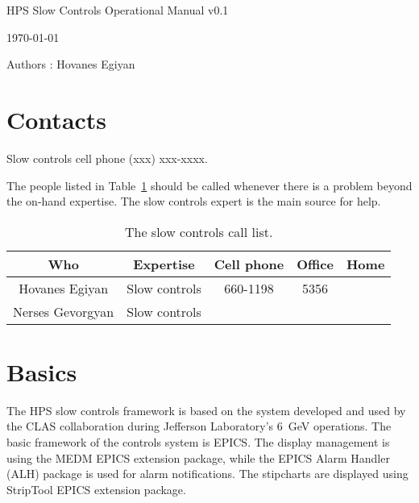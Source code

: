\documentclass[letter,10pt]{article}
\begin{document}
\begin{center}
\Large HPS Slow Controls Operational Manual v0.1

\today

\normalsize Authors : Hovanes Egiyan\\

\end{center}

\section{Contacts}
Slow controls cell phone (xxx) xxx-xxxx. \newline 

The people listed in Table~\ref{tab:controls_contact} should be called whenever there is a problem beyond the on-hand
expertise. The slow controls expert is the main source for help.
\begin{table}[h]
\begin{center}
\begin{tabular}{|c|c|c|c|c|}   \hline
	  Who 			& Expertise		&  Cell phone	&   Office  	&		Home    \\  \hline
\hline
         Hovanes Egiyan		& Slow controls		& 660-1198	&  5356		& 			\\  \hline
         Nerses Gevorgyan	& Slow controls		&		& 		& 			\\  \hline 
\end{tabular}
\end{center}
\caption{The slow controls call list.}
\label{tab:controls_contact}
\end{table}


\section{Basics}
The HPS slow controls framework is based on the system developed and used by the CLAS collaboration during Jefferson Laboratory's 6~GeV 
operations. The basic framework of the controls system is EPICS. The display management is using the MEDM EPICS extension package, 
while the EPICS Alarm Handler (ALH) package is used for alarm notifications. The stipcharts are displayed using StripTool EPICS extension package. 
\end{document}
